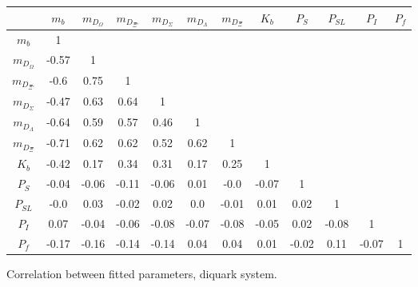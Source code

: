 \begin{tabular}{c | c c c c c c c c c c c}\hline \hline
         &  $m_{b}$ & $m_{D_{\Omega}}$ & $m_{D_{\Xi'}}$ & $m_{D_{\Sigma}}$ & $m_{D_{\Lambda}}$ & $m_{D_{\Xi}}$ &  $K_b$   & $P_S$ & $P_{SL}$ & $P_{I}$ & $P_f$ \\ \hline
 $m_{b}$ &     1   &   &   &   &    &   &   &  & & &  \\ 
$m_{D_{\Omega}}$ & -0.57 &  1   &   &  &   &   &   &    &   &   &  \\ 
$m_{D_{\Xi'}}$ & -0.6 & 0.75 &  1   &   &   &   &  &  &  &  & \\ 
$m_{D_{\Sigma}}$ & -0.47 & 0.63 & 0.64 &  1   &   &   &   &   &   &  &  \\ 
$m_{D_{\Lambda}}$ & -0.64 & 0.59 & 0.57 & 0.46 &  1   &   &   &   &    &   &  \\ 
$m_{D_{\Xi}}$ & -0.71 & 0.62 & 0.62 & 0.52 & 0.62 &  1   &   &   &   &    &   \\ 
 $K_b$   & -0.42 & 0.17 & 0.34 & 0.31 & 0.17 & 0.25 & 1   &   &   &   & \\ 
 $P_S$   & -0.04 & -0.06 & -0.11 & -0.06 & 0.01 & -0.0 & -0.07 & 1   &   &   & \\ 
 $P_{SL}$& -0.0 & 0.03 & -0.02 & 0.02 & 0.0 & -0.01 & 0.01 & 0.02 & 1   &   &  \\ 
 $P_I$   & 0.07 & -0.04 & -0.06 & -0.08 & -0.07 & -0.08 & -0.05 & 0.02 & -0.08 & 1   & \\ 
 $P_f$   & -0.17 & -0.16 & -0.14 & -0.14 & 0.04 & 0.04 & 0.01 & -0.02 & 0.11 & -0.07 & 1 \\ \hline \hline
\end{tabular}
\caption{Correlation between fitted parameters, diquark system.}
\label{tab:diquark_corr}
